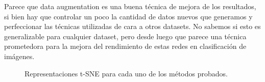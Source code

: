 \documentclass[12pt]{scrartcl}
\begin{document}
\begin{itemize}
    Parece que data augmentation es una buena técnica de mejora de los resultados, si bien hay que controlar un poco la cantidad de datos nuevos que generamos y perfeccionar las técnicas utilizadas de cara a otros datasets. No sabemos si esto es generalizable para cualquier dataset, pero desde luego que parece una técnica prometedora para la mejora del rendimiento de estas redes en clasificación de imágenes.
    
    \begin{figure}[H]
        \centering
        \caption{Representaciones t-SNE para cada uno de los métodos probados.}
        \label{fig:tsne2}
    \end{figure}
    
\end{itemize}


    
\end{document}
